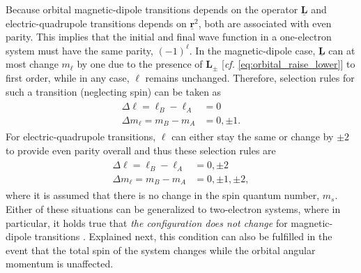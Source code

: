 Because orbital magnetic-dipole transitions depends on the operator $\underline{\mathbold{L}}$ and electric-quadrupole transitions depends on $\underline{\mathbold{r}}^2$, both are associated with even parity. 
This implies that the initial and final wave function in a one-electron system must have the same parity, $(-1)^{\ell}$. 
In the magnetic-dipole case, $\underline{\mathbold{L}}$ can at most change $m_{\ell}$ by one due to the presence of $\mathbold{L}_{\pm}$ [\emph{cf.\@} \cref{eq:orbital_raise_lower}] to first order, while in any case, $\ell$ remains unchanged. 
Therefore, selection rules for such a transition (neglecting spin) can be taken as
\begin{align}
 \begin{split}\label{eq:hydrogen_M1_selection_rules}
 \Delta \ell = \ell_B - \ell_A &= 0 \\
 \Delta m_{\ell} = m_B - m_A &= 0, \pm 1 .
  \end{split}
 \end{align}
For electric-quadrupole transitions, $\ell$ can either stay the same or change by $\pm 2$ to provide even parity overall and thus these selection rules are 
\begin{align}
 \begin{split}\label{eq:hydrogen_E2_selection_rules}
 \Delta \ell = \ell_B - \ell_A &= 0, \pm 2 \\
 \Delta m_{\ell} = m_B - m_A &= 0, \pm 1, \pm 2 ,
  \end{split}
 \end{align}
where it is assumed that there is no change in the spin quantum number, $m_s$. 
Either of these situations can be generalized to two-electron systems, where in particular, it holds true that \emph{the configuration does not change} for magnetic-dipole transitions \cite{Rybicki86}. 
Explained next, this condition can also be fulfilled in the event that the total spin of the system changes while the orbital angular momentum is unaffected. 

